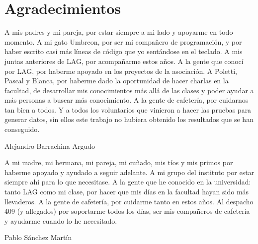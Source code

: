 
\chapter*{Agradecimientos}

A mis padres y mi pareja, por estar siempre a mi lado y apoyarme en todo momento.
A mi gato Umbreon, por ser mi compañero de programación, y por haber escrito casi más líneas de código que yo sentándose en el teclado.
A mis juntas anteriores de LAG, por acompañarme estos años.
A la gente que conocí por LAG, por haberme apoyado en los proyectos de la asociación.
A Poletti, Pascal y Blanca, por haberme dado la oportunidad de hacer charlas en la facultad, de desarrollar mis conocimientos más allá de las clases y poder ayudar a más personas a buscar más conocimiento.
A la gente de cafetería, por cuidarnos tan bien a todos.
Y a todos los voluntarios que vinieron a hacer las pruebas para generar datos, sin ellos este trabajo no hubiera obtenido los resultados que se han conseguido.

\begin{flushright}
    Alejandro Barrachina Argudo
\end{flushright}

A mi madre, mi hermana, mi pareja, mi cuñado, mis tíos y mis primos por haberme apoyado y ayudado a seguir adelante.
A mi grupo del instituto por estar siempre ahí para lo que necesitase.
A la gente que he conocido en la universidad: tanto LAG como mi clase, por hacer que mis días en la facultad hayan sido más llevaderos.
A la gente de cafetería, por cuidarme tanto en estos años.
Al despacho 409 (y allegados) por soportarme todos los días, ser mis compañeros de cafetería y ayudarme cuando lo he necesitado.


\begin{flushright}
    Pablo Sánchez Martín
\end{flushright}







